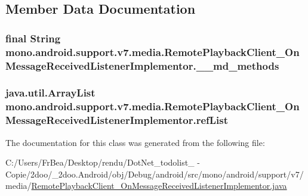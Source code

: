 \subsection{Member Data Documentation}
\hypertarget{classmono_1_1android_1_1support_1_1v7_1_1media_1_1_remote_playback_client___on_message_received_listener_implementor_2b297de4e6a4fb110d08640626cc62e1}{
\subsubsection[{\_\-\_\-md\_\-methods}]{\setlength{\rightskip}{0pt plus 5cm}final String {\bf mono.android.support.v7.media.RemotePlaybackClient\_\-OnMessageReceivedListenerImplementor.\_\-\_\-md\_\-methods}}}
\label{classmono_1_1android_1_1support_1_1v7_1_1media_1_1_remote_playback_client___on_message_received_listener_implementor_2b297de4e6a4fb110d08640626cc62e1}


\hypertarget{classmono_1_1android_1_1support_1_1v7_1_1media_1_1_remote_playback_client___on_message_received_listener_implementor_c173cd5b21c05cc432a6767e0eb7db1e}{
\subsubsection[{refList}]{\setlength{\rightskip}{0pt plus 5cm}java.util.ArrayList {\bf mono.android.support.v7.media.RemotePlaybackClient\_\-OnMessageReceivedListenerImplementor.refList}}}
\label{classmono_1_1android_1_1support_1_1v7_1_1media_1_1_remote_playback_client___on_message_received_listener_implementor_c173cd5b21c05cc432a6767e0eb7db1e}




The documentation for this class was generated from the following file:\begin{CompactItemize}
\item 
C:/Users/FrBea/Desktop/rendu/DotNet\_\-todolist\_ - Copie/2doo/\_\-2doo.Android/obj/Debug/android/src/mono/android/support/v7/media/\hyperlink{_remote_playback_client___on_message_received_listener_implementor_8java}{RemotePlaybackClient\_\-OnMessageReceivedListenerImplementor.java}\end{CompactItemize}
